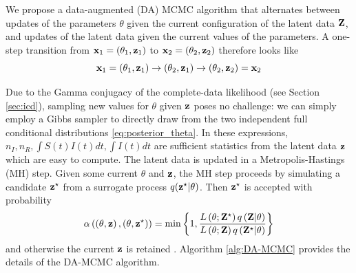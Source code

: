 \documentclass[11pt]{article}
\newcommand{\jx}[1]{{\color{blue}{ #1}}}
\begin{document}
	
	We propose a data-augmented (DA) MCMC algorithm that alternates between updates of the parameters $\theta$ given the current configuration of the latent data $\mathbf{Z}$, and updates of the latent data given the current values of the parameters. A one-step transition from $\mathbf{x}_1 = (\theta_1, \mathbf{z}_1)$ to $\mathbf{x}_2 = (\theta_2, \mathbf{z}_2)$ therefore looks like
	$$\mathbf{x}_1 = (\theta_1, \mathbf{z}_1) \rightarrow (\theta_2, \mathbf{z}_1) \rightarrow (\theta_2, \mathbf{z}_2) = \mathbf{x}_2$$
	
	Due to the Gamma conjugacy of the complete-data likelihood (see Section \ref{sec:icd}), sampling new values for $\theta$ given $\mathbf{z}$ poses no challenge: we can simply employ a Gibbs sampler to directly draw from the two independent full conditional distributions \ref{eq:posterior_theta}. In these expressions, $n_I, n_R, \int S(t)I(t) dt, \int I(t) dt$ are sufficient statistics from the latent data $\mathbf{z}$ which are easy to compute. 
	The latent data is updated in a Metropolis-Hastings (MH) step. Given some current $\theta$ and $\mathbf{z}$, the MH step proceeds by simulating a candidate $\mathbf{z}^\star$ from a surrogate process $q(\mathbf{z}^\star|\theta)$. Then $\mathbf{z}^\star$ is accepted with probability
	$$
	\alpha\left( \left( \theta, \mathbf{z}\right) , \left( \theta, \mathbf{z}^\star\right) \right) =	\min\left\lbrace 1, \dfrac{L\left( \theta; \mathbf{Z}^\star\right) q\left( \mathbf{Z}|\theta\right)}{L\left( \theta;\mathbf{Z}\right) q\left( \mathbf{Z}^\star|\theta\right)}\right\rbrace
	$$
	and otherwise the current $\mathbf{z}$ is retained \cite{Tierney.1994}.
	Algorithm \ref{alg:DA-MCMC} provides the details of the DA-MCMC algorithm.
	
\end{document}
